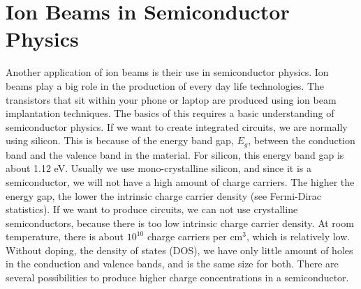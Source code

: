 
\chapter{Ion Beams in Semiconductor Physics}\label{ch:ion-beams-in-semiconductor-physics}
Another application of ion beams is their use in semiconductor physics.
Ion beams play a big role in the production of every day life technologies.
The transistors that sit within your phone or laptop are produced using ion beam implantation techniques.
The basics of this requires a basic understanding of semiconductor physics.
If we want to create integrated circuits, we are normally using silicon.
This is because of the energy band gap, $E_g$, between the conduction band and the valence band in the material.
For silicon, this energy band gap is about 1.12 eV.
Usually we use mono-crystalline silicon, and since it is a semiconductor, we will not have a high amount of charge carriers.
The higher the energy gap, the lower the intrinsic charge carrier density (see Fermi-Dirac statistics).
If we want to produce circuits, we can not use crystalline semiconductors, because there is too low intrinsic charge carrier density.
At room temperature, there is about $10^{10}$ charge carriers per cm$^3$, which is relatively low.
Without doping, the density of states (DOS), we have only little amount of holes in the conduction and valence bands, and is the same size for both.
There are several possibilities to produce higher charge concentrations in a semiconductor.
